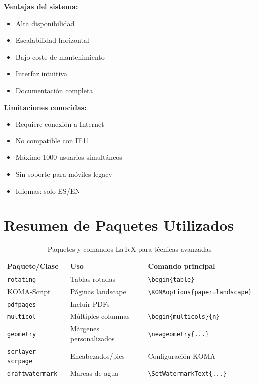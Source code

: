 \noindent
\begin{minipage}[t]{0.48\textwidth}
  \textbf{Ventajas del sistema:}
  \begin{itemize}
    \item Alta disponibilidad
    \item Escalabilidad horizontal
    \item Bajo coste de mantenimiento
    \item Interfaz intuitiva
    \item Documentación completa
  \end{itemize}
\end{minipage}
\hfill
\begin{minipage}[t]{0.48\textwidth}
  \textbf{Limitaciones conocidas:}
  \begin{itemize}
    \item Requiere conexión a Internet
    \item No compatible con IE11
    \item Máximo 1000 usuarios simultáneos
    \item Sin soporte para móviles legacy
    \item Idiomas: solo ES/EN
  \end{itemize}
\end{minipage}

\section{Resumen de Paquetes Utilizados}
\label{sec:resumen-paquetes}

\begin{table}[htbp]
  \centering
  \caption{Paquetes y comandos \LaTeX{} para técnicas avanzadas}
  \label{tab:paquetes-avanzados}
  \EPScabeceraTabla
  \begin{tabular}{llp{6cm}}
    \toprule
    \textbf{Paquete/Clase} & \textbf{Uso} & \textbf{Comando principal} \\
    \midrule
    \texttt{rotating} & Tablas rotadas & \verb|\begin{table}| \\
    KOMA-Script & Páginas landscape & \verb|\KOMAoptions{paper=landscape}| \\
    \texttt{pdfpages} & Incluir PDFs & \verb|| \\
    \texttt{multicol} & Múltiples columnas & \verb|\begin{multicols}{n}| \\
    \texttt{geometry} & Márgenes personalizados & \verb|\newgeometry{...}| \\
    \texttt{scrlayer-scrpage} & Encabezados/pies & Configuración KOMA \\
    \texttt{draftwatermark} & Marcas de agua & \verb|\SetWatermarkText{...}| \\
    \bottomrule
  \end{tabular}
\end{table}
